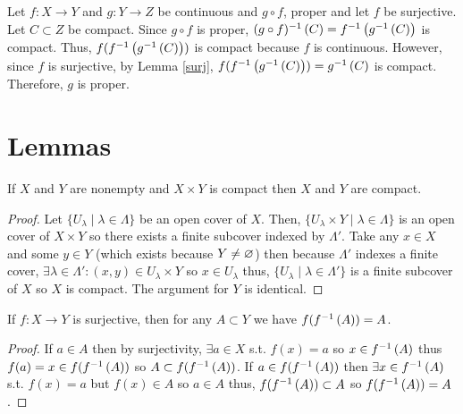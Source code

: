 \documentclass[12pt]{extarticle}
\begin{document}
Let $f : X \to Y$ and $g : Y \to Z$ be continuous and $g \circ f$, proper and let $f$ be surjective. Let $C \subset Z$ be compact. Since $g \circ f$ is proper, $(g \circ f)^{-1} \left( C \right) = f^{-1} \left( g^{-1} \left( C \right) \right)$ is compact. Thus, $f(f^{-1} \left( g^{-1} \left( C \right) \right))$ is compact because $f$ is continuous. However, since $f$ is surjective, by Lemma \ref{surj}, $f(f^{-1} \left( g^{-1} \left( C \right) \right)) = g^{-1} \left( C \right)$ is compact. Therefore, $g$ is proper.         
              
\section*{Lemmas}

\begin{lemma} \label{prodcompac}
If $X$ and $Y$ are nonempty and $X \times Y$ is compact then $X$ and $Y$ are compact. 
\end{lemma}

\begin{proof}
Let $\{U_\lambda \mid \lambda \in \Lambda \}$ be an open cover of $X$. Then, $\{U_\lambda \times Y \mid \lambda \in \Lambda \}$ is an open cover of $X \times Y$ so there exists a finite subcover indexed by $\Lambda'$. Take any $x \in X$ and some $y \in Y$ (which exists because $Y \neq \varnothing$) then because $\Lambda'$ indexes a finite cover, $\exists \lambda \in \Lambda' : (x, y) \in U_\lambda \times Y$ so $x \in U_\lambda$ thus, $\{U_\lambda \mid \lambda \in \Lambda' \}$ is a finite subcover of $X$ so $X$ is compact. The argument for $Y$ is identical. 
\end{proof}

\begin{lemma} \label{surj}
If $f : X \to Y$ is surjective, then for any $A \subset Y$ we have $f(f^{-1} \left( A \right)) = A$.
\end{lemma}

\begin{proof}
If $a \in A$ then by surjectivity, $\exists a \in X$ s.t. $f(x) = a$ so $x \in f^{-1} \left( A \right)$ thus $f(a) = x \in f(f^{-1} \left( A \right))$ so $A \subset f(f^{-1} \left( A \right))$. If $a \in f(f^{-1} \left( A \right))$ then $\exists x \in f^{-1} \left( A \right)$ s.t. $f(x) = a$ but $f(x) \in A$ so $a \in A$ thus, $f(f^{-1} \left( A \right)) \subset A$ so $f(f^{-1} \left( A \right)) = A$.   
\end{proof}
\end{document}
